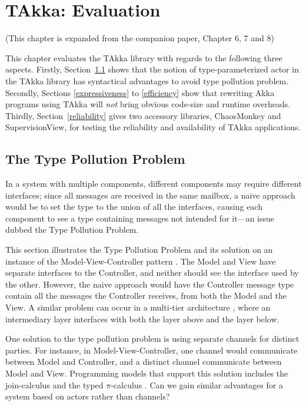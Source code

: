 \chapter{TAkka: Evaluation}
\label{takka_evaluation}

\begin{center}
(This chapter is expanded from the companion paper, Chapter 6, 7 and 8)
\end{center}
\vspace{12 pt}

This chapter evaluates the TAkka library with regards to the following three 
aspects.  Firstly, Section~\ref{type_pollution} shows that the notion of 
type-parameterized actor in the TAkka library has syntactical advantages to 
avoid type pollution problem.  Secondly, Sections 
\ref{expressiveness} to \ref{efficiency} show that rewriting Akka programs 
using TAkka will {\it not} bring obvious code-size and runtime overheads. 
 Thirdly, Section~\ref{reliability} gives two accessory libraries, ChaosMonkey 
and SupervisionView, for testing the reliability and availability of TAkka 
applications. 



\section{The Type Pollution Problem}
\label{type_pollution}

In a system with multiple components, different components may require
different interfaces; since all messages are received in the same
mailbox, a naive approach would be to set the type to the union of all
the interfaces, causing each component to see a type containing
messages not intended for it---an issue dubbed the Type Pollution
Problem.

This section illustrates the Type Pollution Problem and its solution on an
instance of the Model-View-Controller pattern \citep{reenskaug1979original, burbeck87}.  The Model
and View have separate interfaces to the Controller, and neither
should see the interface used by the other.  However, the naive
approach would have the Controller message type contain all the
messages the Controller receives, from both the Model and the View.
A similar problem can occur in a multi-tier architecture \citep{fowler2002patterns},
where an intermediary layer interfaces with both the layer above
and the layer below.

One solution to the type pollution problem is using separate channels
for distinct parties.  For instance, in Model-View-Controller, one
channel would communicate between Model and Controller, and a distinct
channel communicate between Model and View.  Programming models that
support this solution includes the join-calculus \citep{full_join} and
the typed $\pi$-calculus \citep{pi_book}.  Can we gain similar
advantages for a system based on actors rather than channels?


